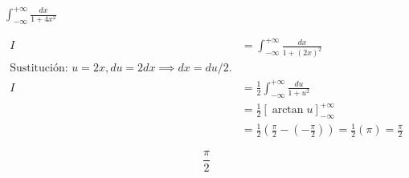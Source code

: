 $\displaystyle \int_{-\infty}^{+\infty} \frac{dx}{1+4x^2}$

\nopagebreak
\begin{align*}
I &= \int_{-\infty}^{+\infty} \frac{dx}{1+(2x)^2} \\
\text{Sustitución: } u=2x, du=2dx \implies dx=du/2. \\
I &= \frac{1}{2} \int_{-\infty}^{+\infty} \frac{du}{1+u^2} \\
&= \frac{1}{2} [\arctan u]_{-\infty}^{+\infty} \\
&= \frac{1}{2} (\frac{\pi}{2} - (-\frac{\pi}{2})) = \frac{1}{2} (\pi) = \frac{\pi}{2}
\end{align*}

\[
\boxed{\displaystyle \frac{\pi}{2}}
\]
